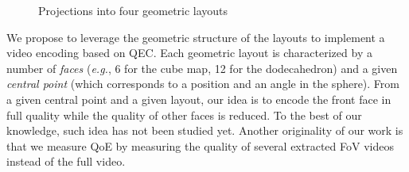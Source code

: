 \begin{figure}[t]
\centering
{}
\caption{Projections into four geometric layouts}\label{fig:mapping}
\end{figure}

We propose to leverage the geometric structure of the layouts
to implement a video encoding based on \ac{QEC}. Each geometric layout is characterized
by a number of \emph{faces} (\textit{e.g.}, 6 for
the cube map, 12 for the dodecahedron) and a given \emph{central point} (which corresponds
to a position and an angle in the sphere).
From a given central point and a given layout, our idea is to encode the front face in full
quality while the quality of other faces is reduced.
To the best of our knowledge, such idea has not been studied yet. Another originality of
our work is that we measure \ac{QoE} by measuring the quality of several extracted
\ac{FoV}
videos instead
of the full video.

